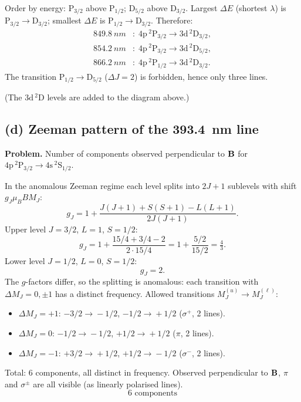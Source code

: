 \documentclass[11pt]{article}
\begin{document}
Order by energy: $\mathrm{P}_{3/2}$ above $\mathrm{P}_{1/2}$; $\mathrm{D}_{5/2}$ above $\mathrm{D}_{3/2}$. Largest $\Delta E$ (shortest $\lambda$) is $\mathrm{P}_{3/2}\!\to\!\mathrm{D}_{3/2}$; smallest $\Delta E$ is $\mathrm{P}_{1/2}\!\to\!\mathrm{D}_{3/2}$. Therefore:
\[
\boxed{\;
\begin{aligned}
\SI{849.8}{nm}&:\;4\mathrm{p}\,{}^{2}\!\mathrm{P}_{3/2}\to 3\mathrm{d}\,{}^{2}\!\mathrm{D}_{3/2},\\
\SI{854.2}{nm}&:\;4\mathrm{p}\,{}^{2}\!\mathrm{P}_{3/2}\to 3\mathrm{d}\,{}^{2}\!\mathrm{D}_{5/2},\\
\SI{866.2}{nm}&:\;4\mathrm{p}\,{}^{2}\!\mathrm{P}_{1/2}\to 3\mathrm{d}\,{}^{2}\!\mathrm{D}_{3/2}.
\end{aligned}\;}
\]
The transition $\mathrm{P}_{1/2}\!\to\!\mathrm{D}_{5/2}$ ($\Delta J=2$) is forbidden, hence only three lines.

(The $3\mathrm{d}\,{}^{2}\!\mathrm{D}$ levels are added to the diagram above.)

\subsection*{(d) Zeeman pattern of the \SI{393.4}{nm} line}

\textbf{Problem.} Number of components observed perpendicular to $\vb B$ for $4\mathrm{p}\,{}^{2}\!\mathrm{P}_{3/2}\to 4\mathrm{s}\,{}^{2}\!\mathrm{S}_{1/2}$.

In the anomalous Zeeman regime each level splits into $2J+1$ sublevels with shift $g_{J}\mu_{B}B M_{J}$:
\[
g_{J}=1+\frac{J(J+1)+S(S+1)-L(L+1)}{2J(J+1)}.
\]
Upper level $J=3/2$, $L=1$, $S=1/2$:
\[
g_{J}=1+\frac{15/4+3/4-2}{2\cdot 15/4}=1+\frac{5/2}{15/2}=\tfrac{4}{3}.
\]
Lower level $J=1/2$, $L=0$, $S=1/2$:
\[
g_{J}=2.
\]
The $g$-factors differ, so the splitting is anomalous: each transition with $\Delta M_{J}=0,\pm 1$ has a distinct frequency.
Allowed transitions $M_{J}^{(u)}\to M_{J}^{(\ell)}$:
\begin{itemize}\itemsep0pt
\item $\Delta M_{J}=+1$: $-3/2\!\to\!-1/2$, $-1/2\!\to\!+1/2$ ($\sigma^{+}$, 2 lines).
\item $\Delta M_{J}=0$: $-1/2\!\to\!-1/2$, $+1/2\!\to\!+1/2$ ($\pi$, 2 lines).
\item $\Delta M_{J}=-1$: $+3/2\!\to\!+1/2$, $+1/2\!\to\!-1/2$ ($\sigma^{-}$, 2 lines).
\end{itemize}
Total: 6 components, all distinct in frequency. Observed perpendicular to $\vb B$, $\pi$ and $\sigma^{\pm}$ are all visible (as linearly polarised lines).
\[
\boxed{\;\text{6 components}\;}
\]
\end{document}
